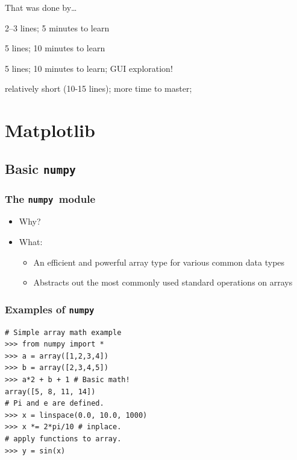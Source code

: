 \documentclass[14pt,compress]{beamer}
\newcounter{time}
\newcommand{\inctime}[1]{\addtocounter{time}{#1}{\tiny \thetime\ m}}
\newcommand{\typ}[1]{\texttt{#1}}
\begin{document}
\begin{frame}
  {That was done by\ldots}
  \begin{description}[CalisthenicsIsAnArt]
      \item[Arrays] 2--3 lines; 5 minutes to learn
      \item[2D plots] 5 lines; 10 minutes to learn
      \item[Simple 3D plots] 5 lines; 10 minutes to learn; GUI
          exploration!
      \item[Complex plots] relatively short (10-15 lines); more time to master; 
  \end{description}
  \inctime{15}
\end{frame}

\section{Matplotlib}

\subsection{Basic \typ{numpy} }

\newcommand{\num}{\texttt{numpy}}

\begin{frame}
  \frametitle{The \num\ module}
  \begin{itemize}
      \item Why?
  \item What:
    \begin{itemize}
    \item An efficient and powerful array type for various common data
      types
    \item Abstracts out the most commonly used standard operations on
      arrays
    \end{itemize}
  \end{itemize}
\end{frame}

\begin{frame}[fragile]
  \frametitle{Examples of \num}
\begin{lstlisting}
# Simple array math example
>>> from numpy import *
>>> a = array([1,2,3,4])
>>> b = array([2,3,4,5])
>>> a*2 + b + 1 # Basic math!
array([5, 8, 11, 14])
# Pi and e are defined.
>>> x = linspace(0.0, 10.0, 1000)
>>> x *= 2*pi/10 # inplace.
# apply functions to array.
>>> y = sin(x)
\end{lstlisting}
\end{frame}
\end{document}
